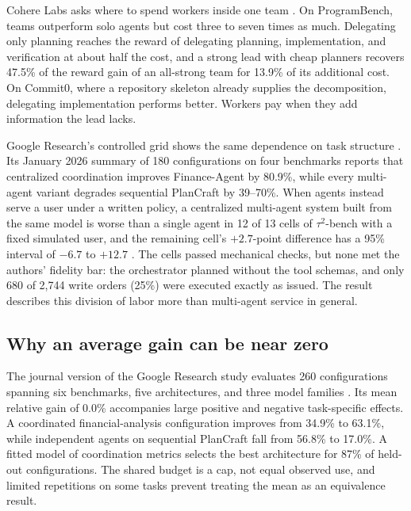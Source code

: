 Cohere Labs asks where to spend workers inside one team \citep{coding-team-compute-allocation}. On ProgramBench, teams outperform solo agents but cost three to seven times as much. Delegating only planning reaches the reward of delegating planning, implementation, and verification at about half the cost, and a strong lead with cheap planners recovers 47.5\% of the reward gain of an all-strong team for 13.9\% of its additional cost. On Commit0, where a repository skeleton already supplies the decomposition, delegating implementation performs better. Workers pay when they add information the lead lacks.

Google Research's controlled grid shows the same dependence on task structure \citep{google-science-of-scaling-agents,kim-scaling-agent-systems}. Its January 2026 summary of 180 configurations on four benchmarks reports that centralized coordination improves Finance-Agent by 80.9\%, while every multi-agent variant degrades sequential PlanCraft by 39--70\%. When agents instead serve a user under a written policy, a centralized multi-agent system built from the same model is worse than a single agent in 12 of 13 cells of $\tau^2$-bench with a fixed simulated user, and the remaining cell's $+2.7$-point difference has a 95\% interval of $-6.7$ to $+12.7$ \citep{collaboration-serving-users}. The cells passed mechanical checks, but none met the authors' fidelity bar: the orchestrator planned without the tool schemas, and only 680 of 2,744 write orders (25\%) were executed exactly as issued. The result describes this division of labor more than multi-agent service in general.

\subsection{Why an average gain can be near zero}
The journal version of the Google Research study evaluates 260 configurations spanning six benchmarks, five architectures, and three model families \citep{kim-scaling-agent-systems}. Its mean relative gain of 0.0\% accompanies large positive and negative task-specific effects. A coordinated financial-analysis configuration improves from 34.9\% to 63.1\%, while independent agents on sequential PlanCraft fall from 56.8\% to 17.0\%. A fitted model of coordination metrics selects the best architecture for 87\% of held-out configurations. The shared budget is a cap, not equal observed use, and limited repetitions on some tasks prevent treating the mean as an equivalence result.


